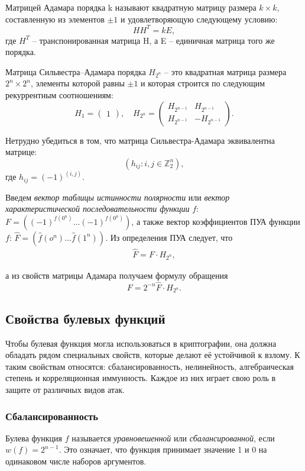 \begin{definition}
    Матрицей Адамара порядка k называют квадратную матрицу размера $k×k$, составленную из элементов $\pm1$ и удовлетворяющую следующему условию:
    \[HH^T = kE,\]
    где $H^T$ – транспонированная матрица H, а E – единичная матрица того же порядка. 
\end{definition}
\begin{definition}
    Матрица Сильвестра–Адамара порядка $H_{2^n}$ – это квадратная матрица размера $2^n×2^n$, элементы которой равны $\pm 1$ и которая строится по следующим рекуррентным соотношениям:
    \[
    H_1 = 
    \begin{pmatrix}
    1
    \end{pmatrix},
    \quad
    H_{2^n} = 
    \begin{pmatrix}
    H_{2^{n-1}} & H_{2^{n-1}} \\
    H_{2^{n-1}} & -H_{2^{n-1}}
    \end{pmatrix}.
    \]
\end{definition}
Нетрудно убедиться в том, что матрица Сильвестра-Адамара эквивалентна матрице: 
\[
(h_{ij}:i,j \in  \mathbb{Z}_2^n),
\]
где $h_{ij} = (-1)^{(i,j)}$.

Введем \textit{вектор таблицы истинности полярности} или \textit{вектор характеристической последовательности функции} $f$: $F = ((-1)^{f(0^n)} \dots (-1)^{f(0^n)})$, а также вектор коэффициентов ПУА функции $f$: $\widehat{F} = \left(\hat{f}(o^n)\dots\hat{f}(1^n)\right)$. Из определения ПУА следует, что 
\begin{align}
    \widehat{F} = F \cdot H_{2^n},
    \label{fwht}
\end{align}
    
а из свойств матрицы Адамара получаем формулу обращения
\[
F = 2^{-n}\widehat{F}\cdot H_{2^n}.
\]
\subsection{Свойства булевых функций}
Чтобы булевая функция могла использоваться в криптографии, она должна обладать рядом специальных свойств, которые делают её устойчивой к взлому. К таким свойствам относятся: сбалансированность, нелинейность, алгебраическая степень и корреляционная иммунность. Каждое из них играет свою роль в защите от различных видов атак.
\subsubsection{Сбалансированность}
Булева функция $f$ называется \textit{уравновешенной} или \textit{сбалансированной}, если $w(f) = 2^{n-1}$. Это означает, что функция принимает значение 1 и 0 на одинаковом числе наборов аргументов.


